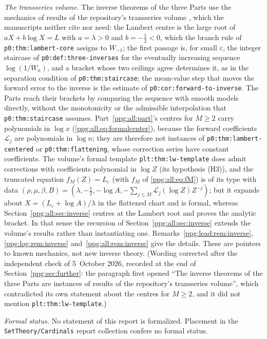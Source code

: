 \documentclass[11pt,letterpaper]{article}
\theoremstyle{remark}\newtheorem{remark}[theorem]{Remark}
\numberwithin{equation}{section}
\newcommand{\file}[1]{\nolinkurl{#1}}
\begin{document}
\emph{The transseries volume.} The inverse theorems of the three Parts use the mechanics of results of the repository's transseries volume \cite{tsvol}, which the manuscripts neither cite nor need: the Lambert centre is the large root of $aX+b\log X=L$ with $a=\lambda>0$ and $b=-\frac12<0$, which the branch rule of \texttt{p0:thm:lambert-core} assigns to $W_{-1}$; the first passage is, for small $\varepsilon$, the integer staircase of \texttt{p0:def:three-inverses} for the eventually increasing sequence $\log(1/W_n)$, and a bracket whose two ceilings agree determines it, as in the separation condition of \texttt{p0:thm:staircase}; the mean-value step that moves the forward error to the inverse is the estimate of \texttt{p0:cor:forward-to-inverse}. The Parts reach their brackets by comparing the sequence with smooth models directly, without the monotonicity or the admissible interpolation that \texttt{p0:thm:staircase} assumes. Part~\ref{ppg:all:part}'s centres for $M\ge2$ carry polynomials in $\log x$ (\eqref{ppg:all:eq:formalcenter}), because the forward coefficients $\mathcal L_j$ are polynomials in $\log n$; they are therefore not instances of \texttt{p0:thm:lambert-centered} or \texttt{p0:thm:flattening}, whose correction series have constant coefficients. The volume's formal template \texttt{plt:thm:lw-template} does admit corrections with coefficients polynomial in $\log Z$ (its hypothesis (H3)), and the truncated equation $f_M(Z)=L_\varepsilon$ (with $f_M$ of \eqref{ppg:all:eq:fM}) is of its type with data $(\rho,\mu,\beta,B)=(\lambda,-\frac12,-\log A,-\sum_{j\le M}\mathcal L_j(\log Z)Z^{-j})$; but it expands about $X=(L_\varepsilon+\log A)/\lambda$ in the flattened chart and is formal, whereas Section~\ref{ppg:all:sec:inverse} centres at the Lambert root and proves the analytic bracket. In that sense the recursion of Section~\ref{ppg:all:sec:inverse} extends the volume's results rather than instantiating one. Remarks~\ref{ppg:lead:rem:inverse}, \ref{ppg:log:rem:inverse} and~\ref{ppg:all:rem:inverse} give the details. These are pointers to known mechanics, not new inverse theory. (Wording corrected after the independent check of 5~October 2026, recorded at the end of Section~\ref{ppg:sec:further}: the paragraph first opened ``The inverse theorems of the three Parts are instances of results of the repository's transseries volume'', which contradicted its own statement about the centres for $M\ge2$, and it did not mention \texttt{plt:thm:lw-template}.)

\emph{Formal status.} No statement of this report is formalized. Placement in the \file{SetTheory/Cardinals} report collection confers no formal status.
\end{document}
